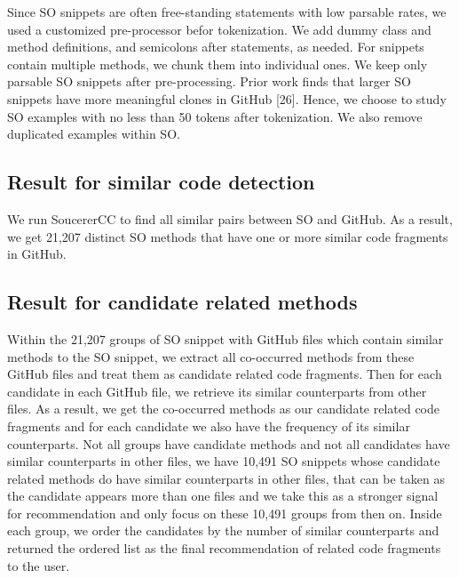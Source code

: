 Since SO snippets are often free-standing statements with low parsable rates, we used a customized pre-processor befor tokenization. We add dummy class and method definitions, and semicolons after statements, as needed. For snippets contain multiple methods, we chunk them into individual ones. We keep only parsable SO snippets after pre-processing. Prior work finds that larger SO snippets have more meaningful clones in GitHub [26]. Hence, we choose to study SO examples with no less than 50 tokens after tokenization. We also remove duplicated examples within SO.

\subsection{Result for similar code detection}
We run SoucererCC to find all similar pairs between SO and GitHub. As a result, we get 21,207 distinct SO methods that have one or more similar code fragments in GitHub.

\subsection{Result for candidate related methods}
Within the 21,207 groups of SO snippet with GitHub files which contain similar methods to the SO snippet, we extract all co-occurred methods from these GitHub files and treat them as candidate related code fragments. Then for each candidate in each GitHub file, we retrieve its similar counterparts from other files. As a result, we get the co-occurred methods as our candidate related code fragments and for each candidate we also have the frequency of its similar counterparts. Not all groups have candidate methods and not all candidates have similar counterparts in other files, we have 10,491 SO snippets whose candidate related methods do have similar counterparts in other files, that can be taken as the candidate appears more than one files and we take this as a stronger signal for recommendation and only focus on these 10,491 groups from then on. Inside each group, we order the candidates by the number of similar counterparts and returned the ordered list as the final recommendation of related code fragments to the user.
